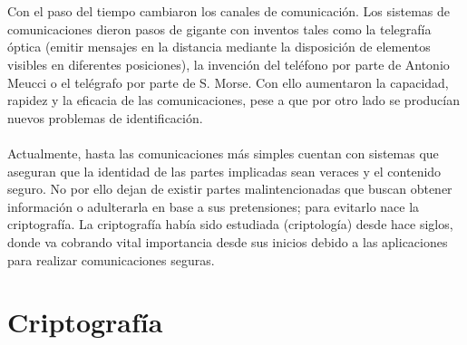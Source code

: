 \documentclass[../PFC.tex]{subfiles}
\begin{document}
\\\\
Con el paso del tiempo cambiaron los canales de comunicación. Los sistemas de comunicaciones dieron pasos de gigante con inventos tales como la telegrafía óptica (emitir mensajes en la distancia mediante la disposición de elementos visibles en diferentes posiciones), la invención del teléfono por parte de Antonio Meucci o el telégrafo por parte de S. Morse. Con ello aumentaron la capacidad, rapidez y la eficacia de las comunicaciones, pese a que por otro lado se producían nuevos problemas de identificación.
\\\\
Actualmente, hasta las comunicaciones más simples cuentan con sistemas que aseguran que la identidad de las partes implicadas sean veraces y el contenido seguro. No por ello dejan de existir partes malintencionadas que buscan obtener información o adulterarla en base a sus pretensiones; para evitarlo nace la criptografía. La criptografía había sido estudiada (criptología) desde hace siglos, donde va cobrando vital importancia desde sus inicios debido a las aplicaciones para realizar comunicaciones seguras.

\section{Criptografía}
\label{Criptografía}
\end{document}
